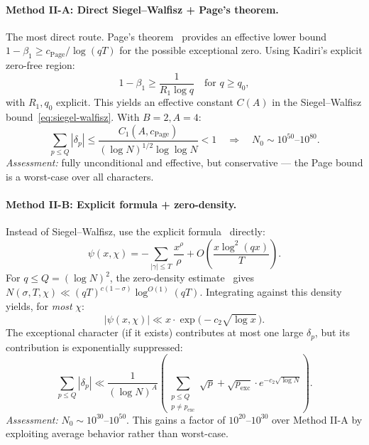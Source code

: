 \documentclass[11pt,a4paper]{article}
\theoremstyle{remark}
\begin{document}
\paragraph{Method II-A: Direct Siegel--Walfisz + Page's theorem.}
The most direct route.  Page's
theorem~\cite[Ch.~14]{Davenport2000} provides an effective lower bound
$1 - \beta_1 \geq c_{\text{Page}}/\log(qT)$ for the possible
exceptional zero.  Using Kadiri's explicit zero-free region:
\begin{equation}
\label{eq:kadiri}
  1 - \beta_1 \geq \frac{1}{R_1 \log q}
  \quad \text{for } q \geq q_0,
\end{equation}
with $R_1, q_0$ explicit.  This yields an effective constant $C(A)$ in
the Siegel--Walfisz bound~\eqref{eq:siegel-walfisz}.  With $B=2, A=4$:
\begin{equation}
\label{eq:methodA-N0}
  \sum_{p \leq Q}|\delta_p| \leq \frac{C_1(A, c_{\text{Page}})}{(\log N)^{1/2}\log\log N} < 1
  \quad\Longrightarrow\quad N_0 \sim 10^{50}\text{--}10^{80}.
\end{equation}
\emph{Assessment:} fully unconditional and effective, but conservative
--- the Page bound is a worst-case over all characters.

\paragraph{Method II-B: Explicit formula + zero-density.}
Instead of Siegel--Walfisz, use the explicit
formula~\cite[Ch.~12]{Davenport2000} directly:
\begin{equation}
\label{eq:explicit-formula}
  \psi(x,\chi) = -\sum_{|\gamma| \leq T}\frac{x^{\rho}}{\rho}
    + O\!\left(\frac{x\log^2(qx)}{T}\right).
\end{equation}
For $q \leq Q = (\log N)^2$, the zero-density
estimate~\cite[Ch.~16]{IwaniecKowalski2004} gives
$N(\sigma, T, \chi) \ll (qT)^{c(1-\sigma)}\log^{O(1)}(qT)$.
Integrating against this density yields, for \emph{most} $\chi$:
\begin{equation}
\label{eq:methodB-bound}
  |\psi(x,\chi)| \ll x \cdot \exp\!\bigl(-c_2\sqrt{\log x}\,\bigr).
\end{equation}
The exceptional character (if it exists) contributes at most one large
$\delta_p$, but its contribution is exponentially suppressed:
\begin{equation}
\label{eq:methodB-sum}
  \sum_{p \leq Q}|\delta_p|
    \ll \frac{1}{(\log N)^A}\left(\sum_{\substack{p \leq Q \\ p \neq p_{\text{exc}}}}\sqrt{p}
    + \sqrt{p_{\text{exc}}}\cdot e^{-c_2\sqrt{\log N}}\right).
\end{equation}
\emph{Assessment:} $N_0 \sim 10^{30}$--$10^{50}$.  This gains a factor
of $10^{20}$--$10^{30}$ over Method II-A by exploiting average behavior
rather than worst-case.
\end{document}
